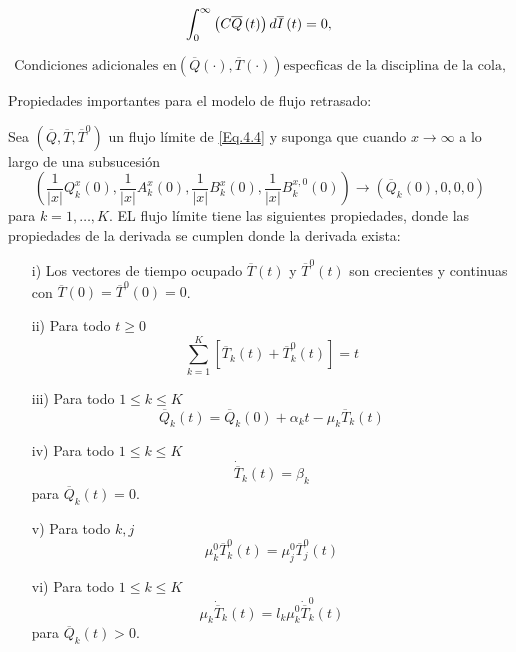 \begin{Teo}
\begin{equation}\label{Eq.MF.5.3a}
\int_{0}^{\infty}\left(C\overline{Q}\left(t\right)\right)d\overline{I}\left(t\right)=0,\\
\end{equation}

\begin{equation}\label{Eq.MF.6.3a}
\textrm{Condiciones adicionales en
}\left(\overline{Q}\left(\cdot\right),\overline{T}\left(\cdot\right)\right)\textrm{
especficas de la disciplina de la cola,}
\end{equation}
\end{Teo}


Propiedades importantes para el modelo de flujo retrasado:

\begin{Prop}
 Sea $\left(\overline{Q},\overline{T},\overline{T}^{0}\right)$ un flujo l\'imite de \ref{Eq.4.4} y suponga que cuando $x\rightarrow\infty$ a lo largo de
una subsucesi\'on
\[\left(\frac{1}{|x|}Q_{k}^{x}\left(0\right),\frac{1}{|x|}A_{k}^{x}\left(0\right),\frac{1}{|x|}B_{k}^{x}\left(0\right),\frac{1}{|x|}B_{k}^{x,0}\left(0\right)\right)\rightarrow\left(\overline{Q}_{k}\left(0\right),0,0,0\right)\]
para $k=1,\ldots,K$. EL flujo l\'imite tiene las siguientes
propiedades, donde las propiedades de la derivada se cumplen donde
la derivada exista:
\begin{itemize}
 \item[i)] Los vectores de tiempo ocupado $\overline{T}\left(t\right)$ y $\overline{T}^{0}\left(t\right)$ son crecientes y continuas con
$\overline{T}\left(0\right)=\overline{T}^{0}\left(0\right)=0$.
\item[ii)] Para todo $t\geq0$
\[\sum_{k=1}^{K}\left[\overline{T}_{k}\left(t\right)+\overline{T}_{k}^{0}\left(t\right)\right]=t\]
\item[iii)] Para todo $1\leq k\leq K$
\[\overline{Q}_{k}\left(t\right)=\overline{Q}_{k}\left(0\right)+\alpha_{k}t-\mu_{k}\overline{T}_{k}\left(t\right)\]
\item[iv)]  Para todo $1\leq k\leq K$
\[\dot{{\overline{T}}}_{k}\left(t\right)=\beta_{k}\] para $\overline{Q}_{k}\left(t\right)=0$.
\item[v)] Para todo $k,j$
\[\mu_{k}^{0}\overline{T}_{k}^{0}\left(t\right)=\mu_{j}^{0}\overline{T}_{j}^{0}\left(t\right)\]
\item[vi)]  Para todo $1\leq k\leq K$
\[\mu_{k}\dot{{\overline{T}}}_{k}\left(t\right)=l_{k}\mu_{k}^{0}\dot{{\overline{T}}}_{k}^{0}\left(t\right)\] para $\overline{Q}_{k}\left(t\right)>0$.
\end{itemize}
\end{Prop}

